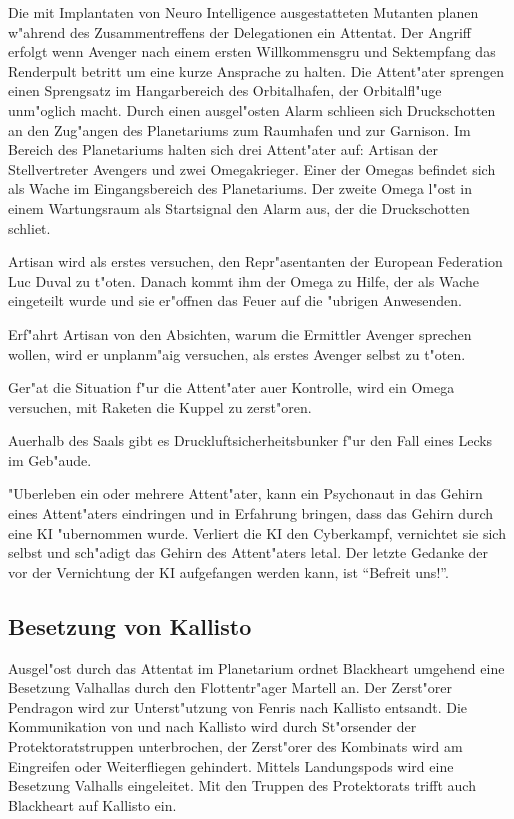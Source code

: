 Die mit Implantaten von Neuro Intelligence ausgestatteten Mutanten planen w"ahrend des Zusammentreffens der Delegationen ein Attentat. Der Angriff erfolgt wenn Avenger nach einem ersten Willkommensgru\3 und Sektempfang das Renderpult betritt um eine kurze Ansprache zu halten. Die Attent"ater sprengen einen Sprengsatz im Hangarbereich des Orbitalhafen, der Orbitalfl"uge unm"oglich macht. Durch einen ausgel"osten Alarm schlie\3en sich Druckschotten an den Zug"angen des Planetariums zum Raumhafen und zur Garnison. Im Bereich des Planetariums halten sich drei Attent"ater auf: Artisan der Stellvertreter Avengers und zwei Omegakrieger. Einer der Omegas befindet sich als Wache im Eingangsbereich des Planetariums. Der zweite Omega l"ost in einem Wartungsraum als Startsignal den Alarm aus, der die Druckschotten schlie\3t.

\begin{remarks}
	Artisan wird als erstes versuchen, den Repr"asentanten der European Federation Luc Duval zu t"oten. Danach kommt ihm der Omega zu Hilfe, der als Wache eingeteilt wurde und sie er"offnen das Feuer auf die "ubrigen Anwesenden.
	
	Erf"ahrt Artisan von den Absichten, warum die Ermittler Avenger sprechen wollen, wird er unplanm"a\3ig versuchen, als erstes Avenger selbst zu t"oten.
	
	Ger"at die Situation f"ur die Attent"ater au\3er Kontrolle, wird ein Omega versuchen, mit Raketen die Kuppel zu zerst"oren.
	
	Au\3erhalb des Saals gibt es Druckluftsicherheitsbunker f"ur den Fall eines Lecks im Geb"aude.
	
	"Uberleben ein oder mehrere Attent"ater, kann ein Psychonaut in das Gehirn eines Attent"aters eindringen und in Erfahrung bringen, dass das Gehirn durch eine KI "ubernommen wurde. Verliert die KI den Cyberkampf, vernichtet sie sich selbst und sch"adigt das Gehirn des Attent"aters letal. Der letzte Gedanke der vor der Vernichtung der KI aufgefangen werden kann, ist "`Befreit uns!"'.
\end{remarks}

\subsection{Besetzung von Kallisto}

Ausgel"ost durch das Attentat im Planetarium ordnet Blackheart umgehend eine Besetzung Valhallas durch den Flottentr"ager Martell an. Der Zerst"orer Pendragon wird zur Unterst"utzung von Fenris nach Kallisto entsandt. Die Kommunikation von und nach Kallisto wird durch St"orsender der Protektoratstruppen unterbrochen, der Zerst"orer des Kombinats wird am Eingreifen oder Weiterfliegen gehindert. Mittels Landungspods wird eine Besetzung Valhalls eingeleitet. Mit den Truppen des Protektorats trifft auch Blackheart auf Kallisto ein.

